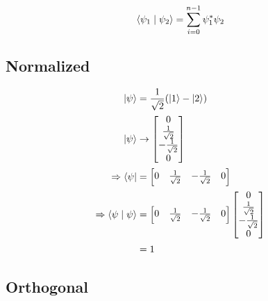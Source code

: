 $$
\braket{\psi_1 \mid \psi_2} = \sum_{i=0}^{n-1} \psi_1^* \psi_2
$$

\subsection{Normalized}

\begin{align}
\ket{\psi} &= \frac{1}{\sqrt{2}}(\ket{1}-\ket{2}) \\
\ket{\psi} &\rightarrow \begin{bmatrix} 0 \\ \frac{1}{\sqrt{2}} \\ -\frac{1}{\sqrt{2}} \\ 0 \end{bmatrix} \\
\Rightarrow \bra{\psi} &= \begin{bmatrix} 0 & \frac{1}{\sqrt{2}} & -\frac{1}{\sqrt{2}} & 0 \end{bmatrix} \\
\Rightarrow \braket{\psi \mid \psi} &= \begin{bmatrix} 0 & \frac{1}{\sqrt{2}} & -\frac{1}{\sqrt{2}} & 0 \end{bmatrix} \begin{bmatrix} 0 \\ \frac{1}{\sqrt{2}} \\ -\frac{1}{\sqrt{2}} \\ 0 \end{bmatrix} \\
&= 1
\end{align}



\subsection{Orthogonal}

